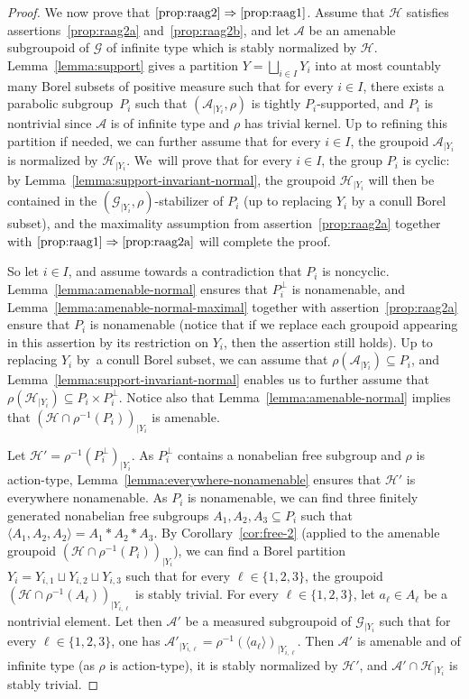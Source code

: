 \documentclass[11pt]{article}
\numberwithin{equation}{section}
\let\mathcal\mathscr
\theoremstyle{plain}
\theoremstyle{definition}
\let\dunion\sqcup
\let\Dunion\bigsqcup
\newcommand{\cala}{\mathcal{A}}
\newcommand{\calg}{\mathcal{G}}
\newcommand{\calh}{\mathcal{H}}
\begin{document}
\begin{proof}
We now prove that $\eqref{prop:raag2}\Rightarrow\eqref{prop:raag1}$. Assume that $\calh$ satisfies assertions~\eqref{prop:raag2a} and~\eqref{prop:raag2b}, and let $\cala$ be an amenable subgroupoid of $\calg$ of infinite type which is stably normalized by $\calh$. Lemma~\ref{lemma:support} gives a partition $Y=\Dunion_{i\in I} Y_i$ into at most countably many Borel subsets of positive measure such that for every $i\in I$, there exists a parabolic subgroup~$P_i$ such that $(\cala_{|Y_i},\rho)$ is tightly $P_i$-supported, and $P_i$ is nontrivial since $\cala$ is of infinite type and $\rho$ has trivial kernel. Up to refining this partition if needed, we can further assume that for every $i\in I$, the groupoid $\cala_{|Y_i}$ is normalized by $\calh_{|Y_i}$. We~will prove that for every $i\in I$, the group $P_i$ is cyclic: by Lemma~\ref{lemma:support-invariant-normal}, the groupoid $\calh_{|Y_i}$ will then be contained in the $(\calg_{|Y_i},\rho)$-stabilizer of $P_i$ (up to replacing $Y_i$ by a conull Borel subset), and the maximality assumption from assertion~\eqref{prop:raag2a} together with $\eqref{prop:raag1}\Rightarrow \eqref{prop:raag2a}$ will complete the proof.

So let $i\in I$, and assume towards a contradiction that $P_i$ is noncyclic. Lemma~\ref{lemma:amenable-normal} ensures that $P_i^\perp$ is nonamenable, and Lemma~\ref{lemma:amenable-normal-maximal} together with assertion~\eqref{prop:raag2a} ensure that $P_i$ is nonamenable (notice that if we replace each groupoid appearing in this assertion by its restriction on $Y_i$, then the assertion still holds). Up to replacing $Y_i$ by~a conull Borel subset, we can assume that $\rho(\cala_{|Y_i})\subseteq P_i$, and Lemma~\ref{lemma:support-invariant-normal} enables us to further assume that $\rho(\calh_{|Y_i})\subseteq P_i\times P_i^\perp$. Notice also that Lemma~\ref{lemma:amenable-normal} implies that $(\calh\cap\rho^{-1}(P_i))_{|Y_i}$ is amenable.

Let $\calh'=\rho^{-1}(P_i^{\perp})_{|Y_i}$. As $P_i^{\perp}$ contains a nonabelian free subgroup and $\rho$ is action-type, Lemma~\ref{lemma:everywhere-nonamenable} ensures that $\calh'$ is everywhere nonamenable. As $P_i$ is nonamenable, we can find three finitely generated nonabelian free subgroups $A_1,A_2,A_3\subseteq P_i$ such that $\langle A_1,A_2,A_2\rangle=A_1\ast A_2\ast A_3$. By Corollary~\ref{cor:free-2} (applied to the amenable groupoid $(\calh\cap\rho^{-1}(P_i))_{|Y_i}$), we can find a Borel partition $Y_i=Y_{i,1}\dunion Y_{i,2}\dunion Y_{i,3}$ such that for every $\ell\in\{1,2,3\}$, the groupoid $(\calh\cap\rho^{-1}(A_\ell))_{|Y_{i,\ell}}$ is stably trivial. For every $\ell\in\{1,2,3\}$, let $a_\ell\in A_\ell$ be a nontrivial element. Let then $\cala'$ be a measured subgroupoid of $\calg_{|Y_i}$ such that for every $\ell\in\{1,2,3\}$, one has $\cala'_{|Y_{i,\ell}}=\rho^{-1}(\langle a_\ell\rangle)_{|Y_{i,\ell}}$. Then $\cala'$ is amenable and of infinite type (as $\rho$ is action-type), it is stably normalized by $\calh'$, and $\cala'\cap\calh_{|Y_i}$ is stably trivial.


\end{proof}
\end{document}
